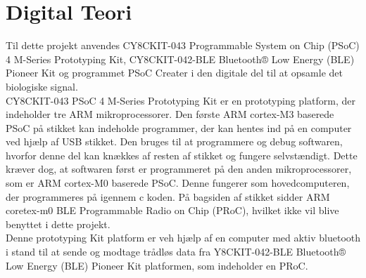 \section{Digital Teori}
Til dette projekt anvendes CY8CKIT-043 Programmable System on Chip (PSoC) 4 M-Series Prototyping Kit, CY8CKIT-042-BLE Bluetooth® Low Energy (BLE) Pioneer Kit og programmet PSoC Creater i den digitale del til at opsamle det biologiske signal.\\
CY8CKIT-043 PSoC 4 M-Series Prototyping Kit er en prototyping platform, der indeholder tre ARM mikroprocessorer. Den første ARM cortex-M3 baserede PSoC på stikket kan indeholde programmer, der kan hentes ind på en computer ved hjælp af USB stikket. Den bruges til at programmere og debug softwaren, hvorfor denne del kan knækkes af resten af stikket og fungere selvstændigt. Dette kræver dog, at softwaren først er programmeret på den anden mikroprocessorer, som er ARM cortex-M0 baserede PSoC. Denne fungerer som hovedcomputeren, der programmeres på igennem c koden. På bagsiden af stikket sidder ARM coretex-m0 BLE Programmable Radio on Chip (PRoC), hvilket ikke vil blive benyttet i dette projekt. \citep{CYPRESS2016PSoC,Semiconductor2016} \\
Denne prototyping Kit platform er veh hjælp af en computer med aktiv bluetooth i stand til at sende og modtage trådløs data fra Y8CKIT-042-BLE Bluetooth® Low Energy (BLE) Pioneer Kit platformen, som indeholder en PRoC.

